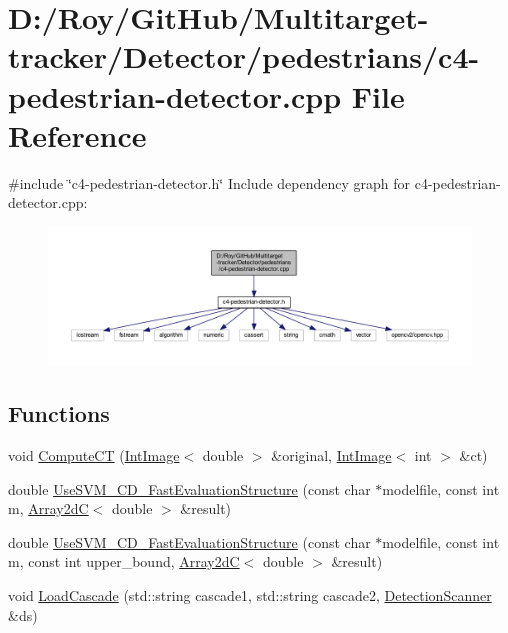 \hypertarget{c4-pedestrian-detector_8cpp}{}\section{D\+:/\+Roy/\+Git\+Hub/\+Multitarget-\/tracker/\+Detector/pedestrians/c4-\/pedestrian-\/detector.cpp File Reference}
\label{c4-pedestrian-detector_8cpp}
{\ttfamily \#include \char`\"{}c4-\/pedestrian-\/detector.\+h\char`\"{}}\newline
Include dependency graph for c4-\/pedestrian-\/detector.cpp\+:\nopagebreak
\begin{figure}[H]
\begin{center}
\leavevmode
\includegraphics[width=350pt]{c4-pedestrian-detector_8cpp__incl}
\end{center}
\end{figure}
\subsection*{Functions}
\begin{DoxyCompactItemize}
\item 
void \mbox{\hyperlink{c4-pedestrian-detector_8cpp_a205804b2ee8558313222a898513a9543}{Compute\+CT}} (\mbox{\hyperlink{class_int_image}{Int\+Image}}$<$ double $>$ \&original, \mbox{\hyperlink{class_int_image}{Int\+Image}}$<$ int $>$ \&ct)
\item 
double \mbox{\hyperlink{c4-pedestrian-detector_8cpp_a1a25c5eeb6b4917c272b201ff023ba68}{Use\+S\+V\+M\+\_\+\+C\+D\+\_\+\+Fast\+Evaluation\+Structure}} (const char $\ast$modelfile, const int m, \mbox{\hyperlink{class_array2d_c}{Array2dC}}$<$ double $>$ \&result)
\item 
double \mbox{\hyperlink{c4-pedestrian-detector_8cpp_a891356b11fe09e40a8b2993bc8d00c01}{Use\+S\+V\+M\+\_\+\+C\+D\+\_\+\+Fast\+Evaluation\+Structure}} (const char $\ast$modelfile, const int m, const int upper\+\_\+bound, \mbox{\hyperlink{class_array2d_c}{Array2dC}}$<$ double $>$ \&result)
\item 
void \mbox{\hyperlink{c4-pedestrian-detector_8cpp_a1c2c730891bb9a5800d3761e8cfaa160}{Load\+Cascade}} (std\+::string cascade1, std\+::string cascade2, \mbox{\hyperlink{class_detection_scanner}{Detection\+Scanner}} \&ds)
\end{DoxyCompactItemize}


